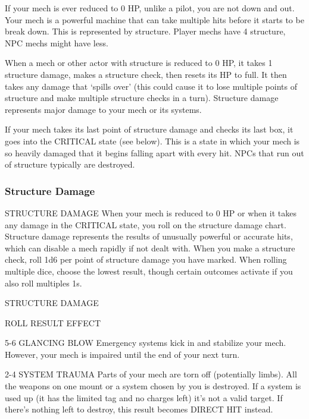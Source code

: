 If your mech is ever reduced to 0 HP, unlike a pilot, you are not down and out. Your mech is a
powerful machine that can take multiple hits before it starts to be break down. This is
represented by structure. Player mechs have 4 structure, NPC mechs might have less.





When a mech or other actor with structure is reduced to 0 HP, it takes 1 structure damage,
makes a structure check, then resets its HP to full. It then takes any damage that ‘spills
over’ (this could cause it to lose multiple points of structure and make multiple structure checks
in a turn). Structure damage represents major damage to your mech or its systems.


If your mech takes its last point of structure damage and checks its last box, it goes into the
CRITICAL state (see below). This is a state in which your mech is so heavily damaged that it
begins falling apart with every hit. NPCs that run out of structure typically are destroyed.

\subsubsection{Structure Damage}
                                        STRUCTURE DAMAGE
When your mech is reduced to 0 HP or when it takes any damage in the CRITICAL state, you roll
on the structure damage chart. Structure damage represents the results of unusually powerful or
accurate hits, which can disable a mech rapidly if not dealt with. When you make a structure
check, roll 1d6 per point of structure damage you have marked. When rolling multiple dice,
choose the lowest result, though certain outcomes activate if you also roll multiples 1s.


                                            STRUCTURE DAMAGE

 ROLL            RESULT                   EFFECT

 5-6             GLANCING BLOW            Emergency systems kick in and stabilize your mech. However, your
                                          mech is impaired until the end of your next turn.

 2-4             SYSTEM TRAUMA            Parts of your mech are torn off (potentially limbs). All the weapons
                                          on one mount or a system chosen by you is destroyed. If a system
                                          is used up (it has the limited tag and no charges left) it’s not a valid
                                          target. If there’s nothing left to destroy, this result becomes DIRECT
                                          HIT instead.

